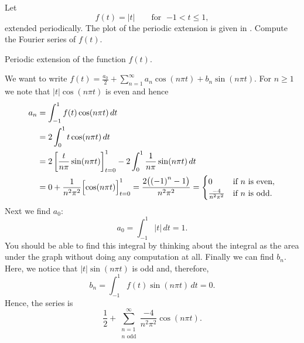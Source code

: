 \begin{example}
Let
\begin{equation*}
f(t) =
\lvert t \rvert
\qquad \text{for } \; {-1} < t \leq 1,
\end{equation*}
extended periodically.  The plot of the
periodic extension is given in .
Compute the Fourier series of $f(t)$.

\begin{myfig}
\capstart
{}
\caption{Periodic extension of the function $f(t)$.\label{gfs:sawcontfig}}
\end{myfig}

We want to
write $f(t) = \frac{a_0}{2} + \sum_{n=1}^\infty a_n \cos (n \pi t) + b_n
\sin (n \pi t)$.  For $n \geq 1$ we note that $\lvert t \rvert \cos (n \pi t)$
is even and hence
\begin{equation*}
\begin{split}
a_n & = \int_{-1}^1 f(t) \cos (n \pi t) \, dt \\
& = 2 \int_{0}^1 t \cos (n \pi t) \, dt \\
 & = 2 \left[ \frac{t}{n \pi} \sin (n \pi t) \right]_{t=0}^1 -
2 \int_{0}^1 \frac{1}{n \pi} \sin (n \pi t) \, dt \\
& =  0 + \frac{1}{n^2 \pi^2} \Bigl[ \cos (n \pi t) \Bigr]_{t=0}^1
 =  \frac{2 \bigl( {(-1)}^n -1 \bigr) }{n^2 \pi^2}
=
\begin{cases}
0 & \text{if } n \text{ is even} , \\
\frac{-4 }{n^2 \pi^2} & \text{if } n \text{ is odd}  .
\end{cases}
\end{split}
\end{equation*}
Next we find $a_0$:
\begin{equation*}
a_0 = \int_{-1}^1 \lvert t \rvert \, dt 
=
1 .
\end{equation*}
You should be able to find this integral by thinking about the integral
as the area under the graph without doing any computation at all.
Finally we can find $b_n$.  Here, we notice that
$\lvert t \rvert \sin (n \pi t)$ is odd and, therefore,
\begin{equation*}
b_n = \int_{-1}^1 f(t) \sin (n \pi t) \, dt = 0 .
\end{equation*}
Hence,
the series is 
\begin{equation*}
\frac{1}{2} + 
\sum_{\substack{n=1 \\ n \text{ odd}}}^\infty \frac{-4}{n^2 \pi^2} \cos (n \pi t) .
\end{equation*}


\end{example}
